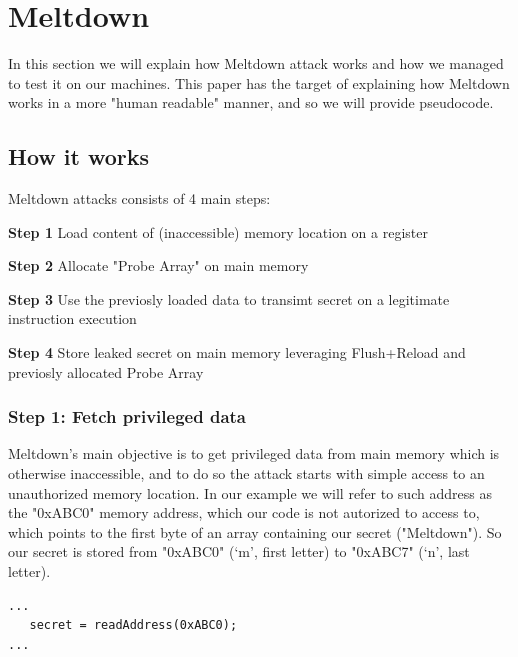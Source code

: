 \section{Meltdown}
In this section we will explain how Meltdown attack works and how we managed to
test it on our machines. This paper has the target of explaining how Meltdown works in a more "human readable" manner, and so we will provide pseudocode.

\subsection{How it works}
Meltdown attacks consists of 4 main steps:

\textbf{Step 1} Load content of (inaccessible) memory location on a register

\textbf{Step 2} Allocate "Probe Array" on main memory

\textbf{Step 3} Use the previosly loaded data to transimt secret on a legitimate instruction execution

\textbf{Step 4} Store leaked secret on main memory leveraging Flush+Reload and previosly allocated Probe Array

\subsubsection{Step 1: Fetch privileged data}
Meltdown's main objective is to get privileged data from main memory which is otherwise inaccessible, and to do so
the attack starts with simple access to an unauthorized memory location.
In our example we will refer to such address as the "0xABC0" memory address, which our code is not autorized to access to,
which points to the first byte of an array containing our secret ("Meltdown").
So our secret is stored from "0xABC0" (`m', first letter) to "0xABC7" (`n', last letter).

\begin{verbatim}
...
   secret = readAddress(0xABC0);
...
\end{verbatim}

